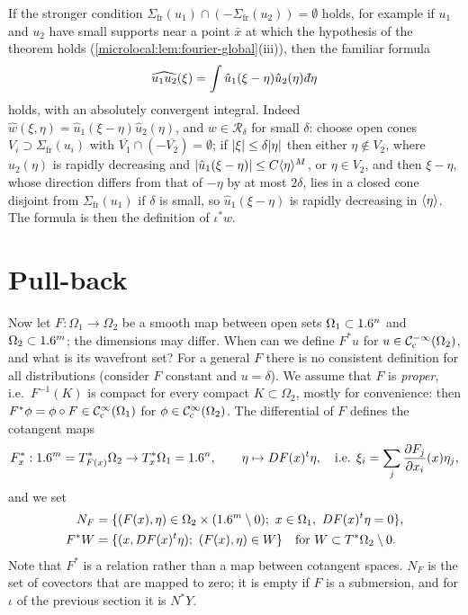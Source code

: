 \begin{remark}\label{microlocal:rem:product-fourier}
  If the stronger condition $\Sigma_{\mathrm{fr}}(u_1)\cap(-\Sigma_{\mathrm{fr}}(u_2))=\emptyset$ holds,
  for example if $u_1$ and $u_2$ have small supports near a point $\bar x$ at
  which the hypothesis of the theorem holds
  (\cref{microlocal:lem:fourier-global}(iii)), then the familiar formula
  \begin{equation*}
    \widehat{u_1u_2}(\xi)=\int\hat u_1(\xi-\eta)\hat u_2(\eta)\,\dbar\eta
  \end{equation*}
  holds, with an absolutely convergent integral. Indeed
  $\hat w(\xi,\eta)=\hat u_1(\xi-\eta)\hat u_2(\eta)$, and $w\in\mathcal
  R_\delta$ for small $\delta$: choose open cones $V_i\supset\Sigma_{\mathrm{fr}}(u_i)$ with
  $\overline{V_1}\cap(-\overline{V_2})=\emptyset$; if $\lvert \xi\rvert\le\delta\lvert \eta\rvert$
  then either $\eta\notin V_2$, where $\hat u_2(\eta)$ is rapidly decreasing
  and $\lvert \hat u_1(\xi-\eta)\rvert\le C\langle \eta\rangle^M$, or $\eta\in V_2$, and then
  $\xi-\eta$, whose direction differs from that of $-\eta$ by at most
  $2\delta$, lies in a closed cone disjoint from $\Sigma_{\mathrm{fr}}(u_1)$ if $\delta$ is
  small, so $\hat u_1(\xi-\eta)$ is rapidly decreasing in $\langle \eta\rangle$. The
  formula is then the definition of $\iota^*w$.
\end{remark}

\section{Pull-back}\label{microlocal:sec:pullback}

Now let $F:\Omega_1\to\Omega_2$ be a smooth map between open sets
$\Omega_1\subset1.6^n$ and $\Omega_2\subset1.6^m$; the dimensions may differ.
When can we define $F^*u$ for $u\in\mathcal{C}^{-\infty}_{\mathrm{c}}(\Omega_2)$, and what is its
wavefront set? For a general $F$ there is no consistent definition for all
distributions (consider $F$ constant and $u=\delta$). We assume that $F$ is
\emph{proper}, i.e.\ $F^{-1}(K)$ is compact for every compact $K\subset\Omega_2$,
mostly for convenience: then $F^*\phi=\phi\circ F\in\mathcal{C}^\infty_{\mathrm{c}}(\Omega_1)$ for
$\phi\in\mathcal{C}^\infty_{\mathrm{c}}(\Omega_2)$. The differential of $F$ defines the cotangent maps
\begin{equation*}
  F^*_x:1.6^m=T^*_{F(x)}\Omega_2\to T^*_x\Omega_1=1.6^n,\qquad
  \eta\mapsto DF(x)^t\eta,\quad\text{i.e. }
  \xi_i=\sum_j\frac{\partial F_j}{\partial x_i}(x)\eta_j,
\end{equation*}
and we set
\begin{align*}
  N_F&=\{(F(x),\eta)\in\Omega_2\times(\R^m\setminus0);\ x\in\Omega_1,\ DF(x)^t\eta=0\},\\
  F^*W&=\{(x,DF(x)^t\eta);\ (F(x),\eta)\in W\}\quad\text{for }W\subset\Tz{\Omega_2}.
\end{align*}
Note that $F^*$ is a relation rather than a map between cotangent spaces.
$N_F$ is the set of covectors that are mapped to zero; it is empty if $F$ is a
submersion, and for $\iota$ of the previous section it is $N^*Y$.

